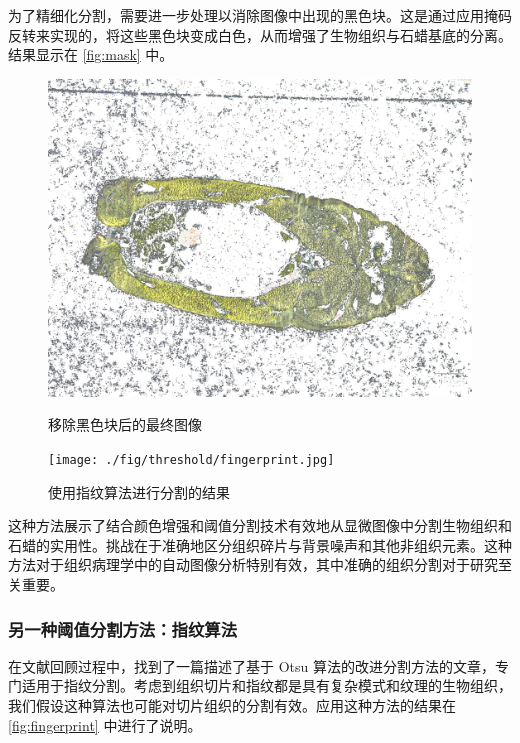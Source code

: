为了精细化分割，需要进一步处理以消除图像中出现的黑色块。这是通过应用掩码反转来实现的，将这些黑色块变成白色，从而增强了生物组织与石蜡基底的分离。结果显示在 \autoref{fig:mask} 中。

\begin{figure}[H]
    \centering
    \begin{minipage}{0.45\textwidth}
        \centering
        \includegraphics[width=\textwidth]{./fig/threshold/final.jpg}
        \caption{移除黑色块后的最终图像}
        \label{fig:mask}
    \end{minipage}
    \begin{minipage}{0.45\textwidth}
        \centering
        \texttt{[image: ./fig/threshold/fingerprint.jpg]}
        \caption{使用指纹算法进行分割的结果}
        \label{fig:fingerprint}
    \end{minipage}
\end{figure}

这种方法展示了结合颜色增强和阈值分割技术有效地从显微图像中分割生物组织和石蜡的实用性。挑战在于准确地区分组织碎片与背景噪声和其他非组织元素。这种方法对于组织病理学中的自动图像分析特别有效，其中准确的组织分割对于研究至关重要。

\subsubsection{另一种阈值分割方法：指纹算法}
在文献回顾过程中，找到了一篇描述了基于 Otsu 算法的改进分割方法的文章，专门适用于指纹分割。考虑到组织切片和指纹都是具有复杂模式和纹理的生物组织，我们假设这种算法也可能对切片组织的分割有效。应用这种方法的结果在 \autoref{fig:fingerprint} 中进行了说明。

